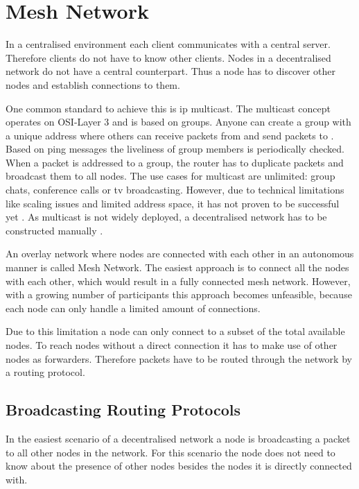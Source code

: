 \section{Mesh Network}\label{sec:mesh-network}

In a centralised environment each client communicates with a central server. Therefore clients do not have to know other clients.
Nodes in a decentralised network do not have a central counterpart. Thus a node has to discover other nodes and establish connections to them.

One common standard to achieve this is \gls{ip} multicast. The multicast concept operates on OSI-Layer 3 and is based on groups. Anyone can create a group with a unique address where others can receive packets from and send packets to \cite[pp. 484-485]{tanenbaum_wetherall_2011}. Based on ping messages the liveliness of group members is periodically checked. When a packet is addressed to a group, the router has to duplicate packets and broadcast them to all nodes. 
The use cases for multicast are unlimited: group chats, conference calls or tv broadcasting.
However, due to technical limitations like scaling issues and limited address space, it has not proven to be successful yet \cite{multicast}.
As multicast is not widely deployed, a decentralised network has to be constructed manually \cite[\S1]{multicast-problems}.

An overlay network where nodes are connected with each other in an autonomous manner is called Mesh Network. The easiest approach is to connect all the nodes with each other, which would result in a fully connected mesh network. However, with a growing number of participants this approach becomes unfeasible, because each node can only handle a limited amount of connections.

Due to this limitation a node can only connect to a subset of the total available nodes. To reach nodes without a direct connection it has to make use of other nodes as forwarders. Therefore packets have to be routed through the network by a routing protocol.

\subsection{Broadcasting Routing Protocols}
In the easiest scenario of a decentralised network a node is broadcasting a packet to all other nodes in the network. For this scenario the node does not need to know about the presence of other nodes besides the nodes it is directly connected with.

